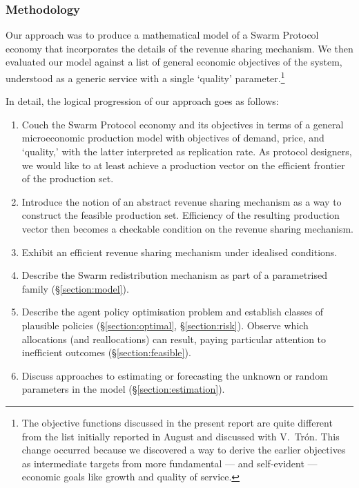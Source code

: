 \subsubsection{Methodology}
%
Our approach was to produce a mathematical model of a Swarm Protocol economy that incorporates the details of the revenue sharing mechanism.
%
We then evaluated our model against a list of general economic objectives of the system, understood as a generic service with a single `quality' parameter.\footnote{The objective functions discussed in the present report are quite different from the list initially reported in August and discussed with V.~Tr\'{o}n.
%
This change occurred because we discovered a way to derive the earlier objectives as intermediate targets from more fundamental --- and self-evident --- economic goals like growth and quality of service.}

In detail, the logical progression of our approach goes as follows:
\begin{enumerate}

  \item 
    Couch the Swarm Protocol economy and its objectives in terms of a general microeconomic production model with objectives of demand, price, and `quality,' with the latter interpreted as replication rate.
    As protocol designers, we would like to at least achieve a production vector on the efficient frontier of the production set.
  
  \item
    Introduce the notion of an abstract revenue sharing mechanism as a way to construct the feasible production set.
    Efficiency of the resulting production vector then becomes a checkable condition on the revenue sharing mechanism.

  \item
    Exhibit an efficient revenue sharing mechanism under idealised conditions.

  \item
    Describe the Swarm redistribution mechanism as part of a parametrised family (\S\ref{section:model}).

  \item
    Describe the agent policy optimisation problem and establish classes of plausible policies (\S\ref{section:optimal}, \S\ref{section:risk}).
    Observe which allocations (and reallocations) can result, paying particular attention to inefficient outcomes (\S\ref{section:feasible}).
    
  \item
    Discuss approaches to estimating or forecasting the unknown or random parameters in the model (\S\ref{section:estimation}).

\end{enumerate}




